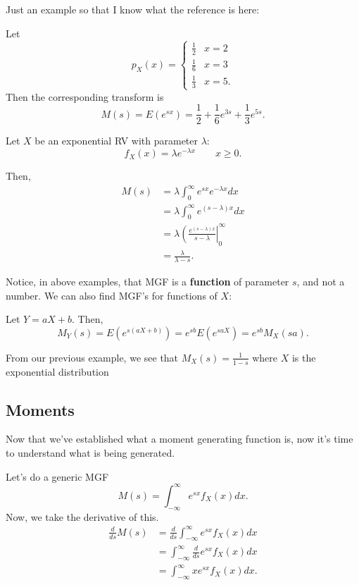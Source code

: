 \documentclass{article}
\begin{document}
Just an example so that I know what the reference is here:
\begin{example}
    Let \[p_X(x) = \begin{cases} \frac{1}{2} & x = 2 \\ \frac{1}{6} & x = 3 \\ \frac{1}{3} & x = 5. \end{cases}\]
    Then the corresponding transform is \[M(s) = E(e^{sx}) = \frac{1}{2} + \frac{1}{6} e^{3s} + \frac{1}{3} e^{5s}. \]
\end{example}

\begin{example}
    Let $X$ be an exponential RV with parameter $\lambda$: \[f_X(x) = \lambda e^{-\lambda x} \qquad x \geq 0.\]

    Then, \begin{align*}
        M(s) &= \lambda \int_{0}^{\infty} e^{sx} e^{-\lambda x} dx \\
        &= \lambda \int_{0}^{\infty} e^{(s - \lambda)x} dx \\
        &= \lambda \left(\frac{e^{(s - \lambda)x}}{s - \lambda}\right|_0^{\infty} \\
        &= \frac{\lambda}{\lambda - s}.
    \end{align*}
\end{example}

Notice, in above examples, that MGF is a \textbf{function} of parameter $s$, and not a number. We can also find MGF's for functions of $X$:

\begin{proposition}
    Let $Y = aX + b$. Then,
    \[M_Y(s) = E(e^{s(aX + b)}) = e^{sb} E(e^{saX}) = e^{sb} M_X(sa).\]
\end{proposition}

From our previous example, we see that $M_X(s) = \frac{1}{1 - s}$ where $X$ is the exponential distribution

\subsection{Moments}
Now that we've established what a moment generating function is, now it's time to understand what is being generated.

Let's do a generic MGF \[M(s) = \int_{-\infty}^{\infty} e^{sx} f_X(x) dx.\] Now, we take the derivative of this. 
\begin{align*} 
    \frac{d}{ds} M(s) &= \frac{d}{ds} \int_{-\infty}^{\infty} e^{sx} f_X(x) dx \\
    &= \int_{-\infty}^\infty \frac{d}{ds} e^{sx} f_X(x) dx \\
    &= \int_{-\infty}^\infty xe^{sx} f_X(x) dx.
\end{align*}
\end{document}
